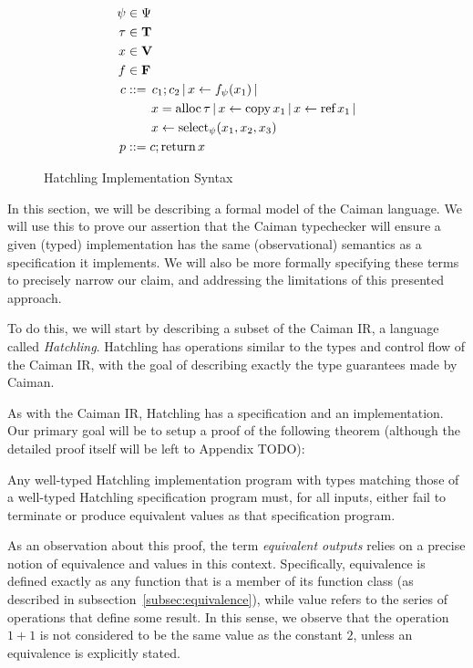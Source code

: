 \begin{figure}
\begin{align*}
	\psi&\in \Psi\\
   	\tau&\in \textbf{T} \\
	x&\in \textbf{V}\\
	f&\in \textbf{F}\\
	c&\mathrel{::=} \,c_1 ; c_2 \,|\, 
        x\leftarrow f_\psi(x_1) \,|
        \\&\qquad
        x=\textrm{alloc}\,\tau \,|\,
        x\leftarrow\textrm{copy}\, x_1 \,|\, 
        x\leftarrow\textrm{ref}\, x_1 \,|
        \\&\qquad
        x\leftarrow\textrm{select}_{\psi} (x_1, x_2, x_3)\\
    p&\mathrel{::=} c;\textrm{return}\, x
\end{align*}
\caption{Hatchling Implementation Syntax}
\label{fig:hatchimplsyntax}
\end{figure}

In this section, we will be describing a formal model of the Caiman language. We will use this to prove our assertion that the Caiman typechecker will ensure a given (typed) implementation has the same (observational) semantics as a specification it implements.  We will also be more formally specifying these terms to precisely narrow our claim, and addressing the limitations of this presented approach.

To do this, we will start by describing a subset of the Caiman IR, a language called \textit{Hatchling}.  Hatchling has operations similar to the types and control flow of the Caiman IR, with the goal of describing exactly the type guarantees made by Caiman.

As with the Caiman IR, Hatchling has a specification and an implementation.    Our primary goal will be to setup a proof of the following theorem (although the detailed proof itself will be left to Appendix TODO):
%
\begin{theorem}
Any well-typed Hatchling implementation program with types matching those of a well-typed Hatchling specification program must, for all inputs, either fail to terminate or produce equivalent values as that specification program.
\end{theorem}
%
As an observation about this proof, the term \textit{equivalent outputs} relies on a precise notion of equivalence and values in this context.  Specifically, equivalence is defined exactly as any function that is a member of its function class (as described in subsection~\ref{subsec:equivalence}), while value refers to the series of operations that define some result.  In this sense, we observe that the operation $1+1$ is not considered to be the same value as the constant $2$, unless an equivalence is explicitly stated.

